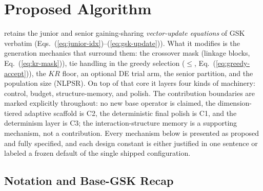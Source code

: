\section{Proposed \dtgsk{} Algorithm}\label{sec:algorithm}

\dtgsk{} retains the junior and senior gaining-sharing \emph{vector-update
equations} of GSK verbatim (Eqs.~(\ref{eq:junior-idx})--(\ref{eq:gsk-update})).
What it modifies is the generation mechanics that surround them: the crossover
mask (linkage blocks, Eq.~(\ref{eq:kr-mask})), tie handling in the greedy
selection ($\le$, Eq.~(\ref{eq:greedy-accept})), the $KR$ floor, an optional
DE trial arm, the senior partition, and the population size (NLPSR). On top of
that core it layers four kinds of machinery: control, budget, structure-memory,
and polish. %
The contribution boundaries are marked explicitly throughout: no new base
operator is claimed, the dimension-tiered adaptive scaffold is C2, the
deterministic final polish is C1, and the determinism layer is C3; the
interaction-structure memory is a supporting mechanism, not a contribution.
Every mechanism below is presented as proposed and fully specified, and
each design constant is either justified in one sentence or labeled a
frozen default of the single shipped configuration.

\subsection{Notation and Base-GSK Recap}\label{sec:alg:notation}

